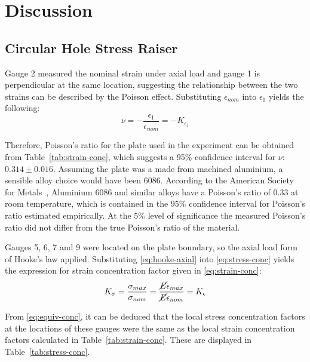 \documentclass[a4paper,11pt,twocolumn]{article}
\begin{document}
\section{Discussion}

\subsection{Circular Hole Stress Raiser}

Gauge 2 measured the nominal strain under axial load and gauge 1 is
perpendicular at the same location, suggesting the relationship between the
two strains can be described by the Poisson effect. Substituting
$\epsilon_{nom}$ into $\epsilon_1$ yields the following:
\begin{equation*}
    \nu = -\frac{\epsilon_1}{\epsilon_{nom}} = -K_{\epsilon_1}
\end{equation*}

Therefore, Poisson's ratio for the plate used in the experiment can be obtained
from Table~\vref{tab:strain-conc}, which suggests a 95\% confidence interval
for $\nu$: $0.314\pm0.016$. Assuming the plate was a made from machined
aluminium, a sensible alloy choice would have been 6086. According to the
American Society for Metals~\cite{asm1978metals}, Aluminium 6086 and similar
alloys have a Poisson's ratio of 0.33 at room temperature, which is contained in
the 95\% confidence interval for Poisson's ratio estimated empirically. At the
5\% level of significance the measured Poisson's ratio did not differ from the
true Poisson's ratio of the material.

Gauges 5, 6, 7 and 9 were located on the plate boundary, so the axial load
form of Hooke's law applied. Substituting \eqref{eq:hooke-axial} into 
\eqref{eq:stress-conc} yields the expression for strain concentration factor 
given in \eqref{eq:strain-conc}:
\begin{equation} \label{eq:equiv-conc}
    K_\sigma = \frac{\sigma_{max}}{\sigma_{nom}}
             = \frac{\cancel{E}\epsilon_{max}}{\cancel{E}\epsilon_{nom}}
             = K_\epsilon
\end{equation}

From \eqref{eq:equiv-conc}, it can be deduced that the local stress
concentration factors at the locations of these gauges were the same as the
local strain concentration factors calculated in Table~\ref{tab:strain-conc}.
These are displayed in Table~\ref{tab:stress-conc}.
\end{document}
